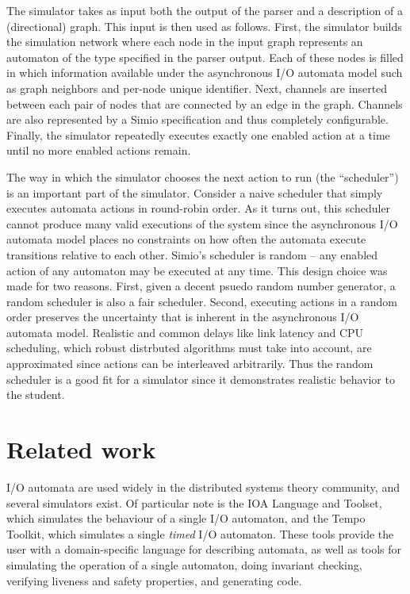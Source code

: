 \documentclass{scrartcl}
\begin{document}
The simulator takes as input both the output of the parser and a description of
a (directional) graph.
This input is then used as follows.
First, the simulator builds the simulation network where each node in the input
graph represents an automaton of the type specified in the parser output.
Each of these nodes is filled in which information available under the
asynchronous I/O automata model such as graph neighbors and per-node unique
identifier.
Next, channels are inserted between each pair of nodes that are connected by an
edge in the graph.
Channels are also represented by a Simio specification and thus completely
configurable.
Finally, the simulator repeatedly executes exactly one enabled action at a time
until no more enabled actions remain.

The way in which the simulator chooses the next action to run (the
``scheduler'') is an important part of the simulator.
Consider a naive scheduler that simply executes automata actions in round-robin
order.
As it turns out, this scheduler cannot produce many valid executions of the
system since the asynchronous I/O automata model places no constraints on how
often the automata execute transitions relative to each other.
Simio's scheduler is random -- any enabled action of any automaton may be
executed at any time.
This design choice was made for two reasons.
First, given a decent psuedo random number generator, a random scheduler is
also a fair scheduler.
Second, executing actions in a random order preserves the uncertainty that is
inherent in the asynchronous I/O automata model.
Realistic and common delays like link latency and CPU scheduling, which robust
distrbuted algorithms must take into account, are approximated since actions
can be interleaved arbitrarily.
Thus the random scheduler is a good fit for a simulator since it demonstrates
realistic behavior to the student.

\section{Related work}

I/O automata are used widely in the distributed systems theory community, and
several simulators exist. Of particular note is the IOA Language and
Toolset\cite{ioa}, which simulates the behaviour of a single I/O automaton, and
the Tempo Toolkit\cite{tempo}, which simulates a single \textit{timed} I/O
automaton. These tools provide the user with a domain-specific language for
describing automata, as well as tools for simulating the operation of a single
automaton, doing invariant checking, verifying liveness and safety properties,
and generating code.
\end{document}
